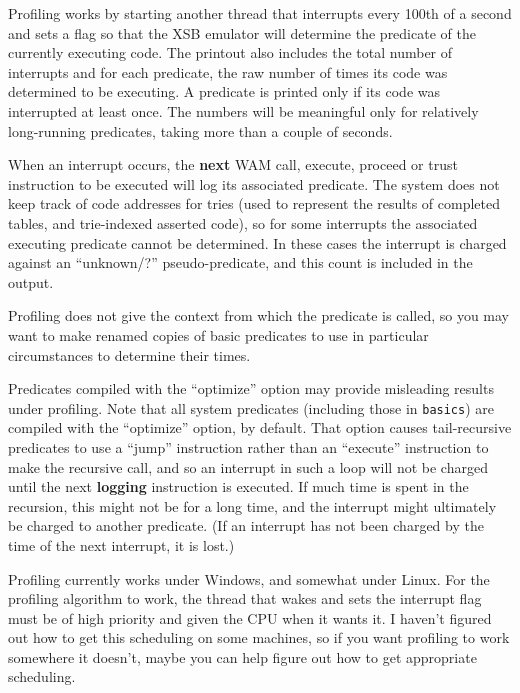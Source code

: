 Profiling works by starting another thread that interrupts every 100th
of a second and sets a flag so that the XSB emulator will determine
the predicate of the currently executing code.  The printout also
includes the total number of interrupts and for each predicate, the
raw number of times its code was determined to be executing.  A
predicate is printed only if its code was interrupted at least once.
The numbers will be meaningful only for relatively long-running
predicates, taking more than a couple of seconds.

When an interrupt occurs, the {\bf next} WAM call, execute, proceed or
trust instruction to be executed will log its associated predicate.
The system does not keep track of code addresses for tries (used to
represent the results of completed tables, and trie-indexed asserted
code), so for some interrupts the associated executing predicate
cannot be determined.  In these cases the interrupt is charged against
an ``unknown/?'' pseudo-predicate, and this count is included in the
output.

Profiling does not give the context from which the predicate is
called, so you may want to make renamed copies of basic predicates to
use in particular circumstances to determine their times.

Predicates compiled with the ``optimize'' option may provide
misleading results under profiling.  Note that all system predicates
(including those in {\tt basics}) are compiled with the ``optimize''
option, by default.  That option causes tail-recursive predicates to
use a ``jump'' instruction rather than an ``execute'' instruction to
make the recursive call, and so an interrupt in such a loop will not
be charged until the next {\bf logging} instruction is executed.  If
much time is spent in the recursion, this might not be for a long
time, and the interrupt might ultimately be charged to another
predicate.  (If an interrupt has not been charged by the time of the
next interrupt, it is lost.)

Profiling currently works under Windows, and somewhat under Linux.
For the profiling algorithm to work, the thread that wakes and sets
the interrupt flag must be of high priority and given the CPU when it
wants it.  I haven't figured out how to get this scheduling on some
machines, so if you want profiling to work somewhere it doesn't, maybe
you can help figure out how to get appropriate scheduling.

